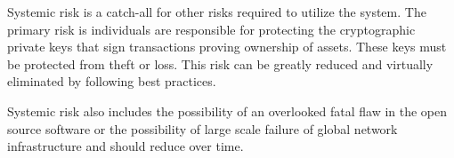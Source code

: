 Systemic risk is a catch-all for other risks required to utilize the system.
The primary risk is individuals are responsible for protecting the
cryptographic private keys that sign transactions proving ownership of assets.
These keys must be protected from theft or loss. This risk can be greatly
reduced and virtually eliminated by following best practices.

Systemic risk also includes the possibility of an overlooked fatal flaw in the
open source software or the possibility of large scale failure of global
network infrastructure and should reduce over time.
